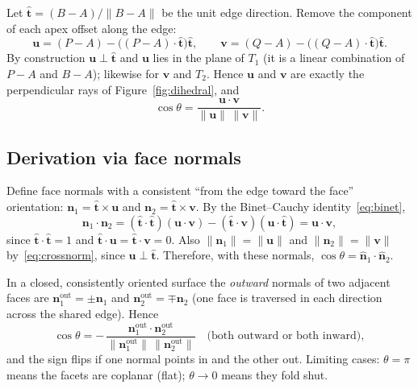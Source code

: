 \documentclass[11pt]{article}
\theoremstyle{definition}
\theoremstyle{remark}
\newcommand{\vb}[1]{\bm{#1}}
\newcommand{\uv}[1]{\hat{\bm{#1}}}
\begin{document}
Let $\uv{t}=(B-A)/\|B-A\|$ be the unit edge direction. Remove the component of each
apex offset along the edge:
\begin{equation}
  \vb{u} = (P-A) - \big((P-A)\cdot\uv{t}\big)\uv{t},\qquad
  \vb{v} = (Q-A) - \big((Q-A)\cdot\uv{t}\big)\uv{t}.
  \label{eq:uv}
\end{equation}
By construction $\vb{u}\perp\uv{t}$ and $\vb{u}$ lies in the plane of $T_1$ (it is a
linear combination of $P-A$ and $B-A$); likewise for $\vb{v}$ and $T_2$. Hence $\vb{u}$ and
$\vb{v}$ are exactly the perpendicular rays of Figure~\ref{fig:dihedral}, and
\begin{equation}
  \boxed{\cos\theta = \frac{\vb{u}\cdot\vb{v}}{\|\vb{u}\|\,\|\vb{v}\|}.}
  \label{eq:dihedral-uv}
\end{equation}

\subsection{Derivation via face normals}

Define face normals with a consistent ``from the edge toward the face'' orientation:
$\vb{n}_1 = \uv{t}\times\vb{u}$ and $\vb{n}_2=\uv{t}\times\vb{v}$. By the Binet--Cauchy
identity~\eqref{eq:binet},
\begin{equation}
  \vb{n}_1\cdot\vb{n}_2 = (\uv{t}\cdot\uv{t})(\vb{u}\cdot\vb{v}) - (\uv{t}\cdot\vb{v})(\vb{u}\cdot\uv{t})
  = \vb{u}\cdot\vb{v},
\end{equation}
since $\uv{t}\cdot\uv{t}=1$ and $\uv{t}\cdot\vb{u}=\uv{t}\cdot\vb{v}=0$. Also
$\|\vb{n}_1\|=\|\vb{u}\|$ and $\|\vb{n}_2\|=\|\vb{v}\|$ by~\eqref{eq:crossnorm}, since
$\vb{u}\perp\uv{t}$. Therefore, with these normals, $\cos\theta=\uv{n}_1\cdot\uv{n}_2$.

In a closed, consistently oriented surface the \emph{outward} normals of two
adjacent faces are $\vb{n}_1^{\text{out}}=\pm\vb{n}_1$ and $\vb{n}_2^{\text{out}}=\mp\vb{n}_2$
(one face is traversed in each direction across the shared edge). Hence
\begin{equation}
  \boxed{\cos\theta = -\,\frac{\vb{n}^{\text{out}}_1\cdot\vb{n}^{\text{out}}_2}{\|\vb{n}^{\text{out}}_1\|\,\|\vb{n}^{\text{out}}_2\|}}
  \quad\text{(both outward or both inward)},
  \label{eq:dihedral-normals}
\end{equation}
and the sign flips if one normal points in and the other out. Limiting cases: $\theta=\pi$
means the facets are coplanar (flat); $\theta\to 0$ means they fold shut.
\end{document}
